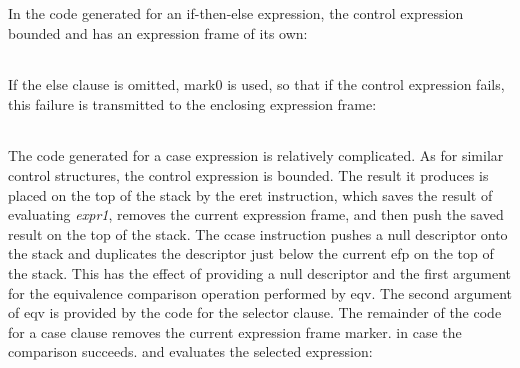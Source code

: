 In the code generated for an if-then-else expression, the control
expression bounded and has an expression frame of its own:

\begin{center}
\tablelasttail{\hline}
\begin{supertabular}{|m{1.9073598in}|m{2.75596in}|}

\end{supertabular}
\end{center}

If the else clause is omitted, mark0 is used, so that if the control
expression fails, this failure is transmitted to the enclosing
expression frame:

\begin{center}
\tablelasttail{\hline}
\begin{supertabular}{|m{1.9073598in}|m{2.75596in}|}

\end{supertabular}
\end{center}

The code generated for a case expression is relatively complicated. As
for similar control structures, the control expression is bounded. The
result it produces is placed on the top of the stack by the eret
instruction, which saves the result of evaluating \textit{expr1},
removes the current expression frame, and then push the saved result
on the top of the stack. The ccase instruction pushes a null
descriptor onto the stack and duplicates the descriptor just below the
current efp on the top of the stack. This has the effect of providing
a null descriptor and the first argument for the equivalence
comparison operation performed by eqv. The second argument of eqv is
provided by the code for the selector clause. The remainder of the
code for a case clause removes the current expression frame marker. in
case the comparison succeeds. and evaluates the selected expression:

